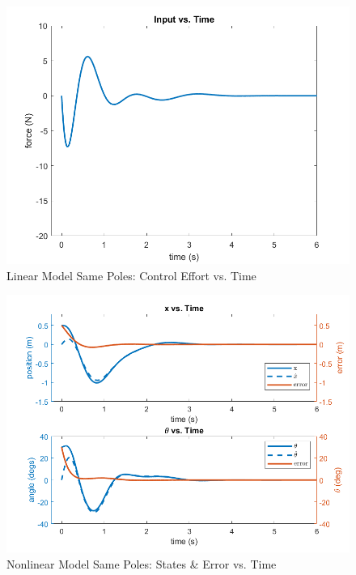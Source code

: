 \documentclass[12pt, letterpaper, onecolumn]{article}
\begin{document}
\begin{figure}[!h]
    \centering
    \includegraphics[width=\linewidth]{figs/p5-cl-input.png}
    \caption{Linear Model Same Poles: Control Effort vs. Time}
    \label{}
\end{figure}

\begin{figure}[!h]
    \centering
    \includegraphics[width=\linewidth]{figs/p5-cnl-states.png}
    \caption{Nonlinear Model Same Poles: States \& Error vs. Time}
    \label{}
\end{figure}
\end{document}
